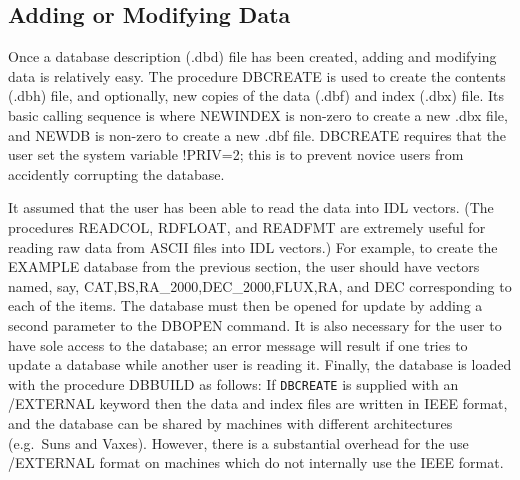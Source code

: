 \subsection{Adding or Modifying Data}

Once a database description (.dbd) file has been created, adding and 
modifying data is relatively easy.   The procedure DBCREATE is used
to create the contents (.dbh) file, and optionally, new copies of the 
data (.dbf) and index (.dbx) file.  Its basic calling sequence is
where NEWINDEX is non-zero to create a new .dbx file, and NEWDB is non-zero
to create a new .dbf file.  DBCREATE requires that the user set the system
variable !PRIV=2; this is to prevent novice users from accidently corrupting
the database.

It assumed that the user has been able to read the data into IDL vectors.
(The procedures READCOL, RDFLOAT, and READFMT are extremely useful for 
reading raw data from ASCII files into IDL vectors.)   For example, to create 
the EXAMPLE database from the previous section, the user should have vectors
named, say, CAT,BS,RA\_2000,DEC\_2000,FLUX,RA, and DEC corresponding to 
each of the items.   The database must then be opened for update by
adding a second parameter to the DBOPEN command.  It is also necessary
for the user to have sole access to the database; an error message will
result if one tries to update a database while another user is reading it.
Finally, the database is loaded with the procedure
DBBUILD as follows:
\exbegin
{}
\exend
If {\tt DBCREATE} is supplied with an /EXTERNAL keyword then the data
and index files are written in IEEE format, and the database can be
shared by machines with different architectures (e.g.\ Suns and Vaxes).
However, there is a substantial overhead for the use /EXTERNAL format 
on machines which do not internally use the IEEE format.

